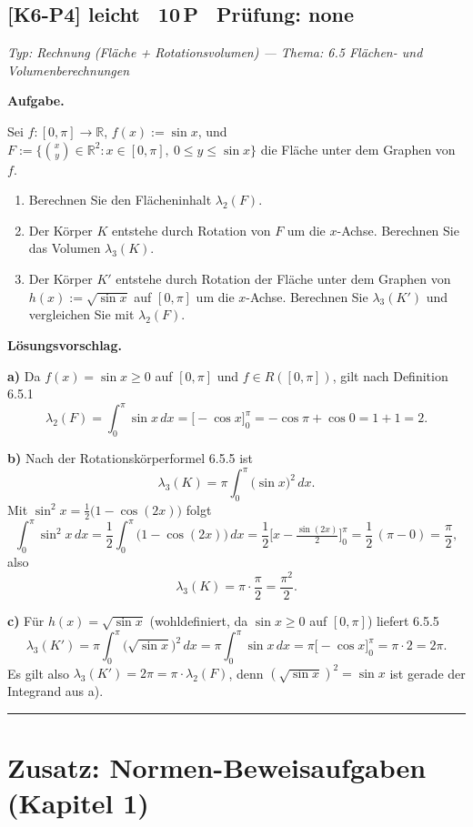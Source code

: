 \documentclass[a4paper,11pt]{article}
\begin{document}
\subsection*{[K6-P4] \normalfont leicht \textbullet\ 10\,P \textbullet\ Pr\"ufung: none}
\textit{Typ: Rechnung (Fläche + Rotationsvolumen)  ---  Thema: 6.5 Flächen- und Volumenberechnungen}\par\smallskip
\textbf{Aufgabe.}\par
Sei $f:[0,\pi]\to\mathbb{R}$, $f(x):=\sin x$, und $F:=\{\binom{x}{y}\in\mathbb{R}^2 : x\in[0,\pi],\ 0\le y\le\sin x\}$ die Fläche unter dem Graphen von $f$.
\begin{enumerate}[label=\alph*)]
\item Berechnen Sie den Flächeninhalt $\lambda_2(F)$.
\item Der Körper $K$ entstehe durch Rotation von $F$ um die $x$-Achse. Berechnen Sie das Volumen $\lambda_3(K)$.
\item Der Körper $K'$ entstehe durch Rotation der Fläche unter dem Graphen von $h(x):=\sqrt{\sin x}$ auf $[0,\pi]$ um die $x$-Achse. Berechnen Sie $\lambda_3(K')$ und vergleichen Sie mit $\lambda_2(F)$.
\end{enumerate}\par\smallskip
\textbf{L\"osungsvorschlag.}\par
\textbf{a)} Da $f(x)=\sin x\ge 0$ auf $[0,\pi]$ und $f\in R([0,\pi])$, gilt nach Definition 6.5.1
\[\lambda_2(F)=\int_0^{\pi}\sin x\,dx=\big[-\cos x\big]_0^{\pi}=-\cos\pi+\cos 0=1+1=2.\]

\textbf{b)} Nach der Rotationskörperformel 6.5.5 ist
\[\lambda_3(K)=\pi\int_0^{\pi}\big(\sin x\big)^{2}\,dx.\]
Mit $\sin^2 x=\tfrac12\big(1-\cos(2x)\big)$ folgt
\[\int_0^{\pi}\sin^{2}x\,dx=\frac12\int_0^{\pi}\big(1-\cos(2x)\big)\,dx=\frac12\Big[x-\tfrac{\sin(2x)}{2}\Big]_0^{\pi}=\frac12\,(\pi-0)=\frac{\pi}{2},\]
also
\[\lambda_3(K)=\pi\cdot\frac{\pi}{2}=\frac{\pi^{2}}{2}.\]

\textbf{c)} Für $h(x)=\sqrt{\sin x}$ (wohldefiniert, da $\sin x\ge 0$ auf $[0,\pi]$) liefert 6.5.5
\[\lambda_3(K')=\pi\int_0^{\pi}\big(\sqrt{\sin x}\big)^{2}\,dx=\pi\int_0^{\pi}\sin x\,dx=\pi\big[-\cos x\big]_0^{\pi}=\pi\cdot 2=2\pi.\]
Es gilt also $\lambda_3(K')=2\pi=\pi\cdot\lambda_2(F)$, denn $(\sqrt{\sin x})^2=\sin x$ ist gerade der Integrand aus a).\par\bigskip\hrule\bigskip
\section*{Zusatz: Normen-Beweisaufgaben (Kapitel 1)}
\end{document}

